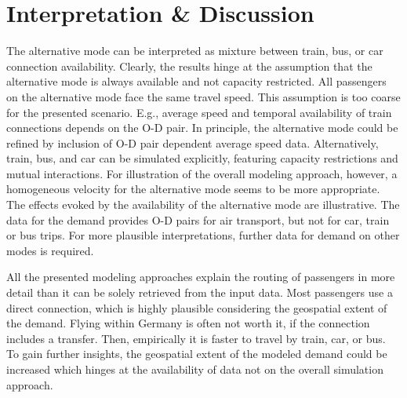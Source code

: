\section{Interpretation \& Discussion}
\label{sec:air_rail_discussion}

The alternative mode can be interpreted as mixture between train, bus, or car connection availability. 
Clearly, the results hinge at the assumption that the alternative mode is always available and not capacity restricted.  
All passengers on the alternative mode face the same travel speed. 
This assumption is too coarse for the presented scenario. 
E.g., average speed and temporal availability of train connections depends on the O-D pair. 
In principle, the alternative mode could be refined by inclusion of O-D pair dependent average speed data. 
Alternatively, train, bus, and car can be simulated explicitly, featuring capacity restrictions and mutual interactions. 
For illustration of the overall modeling approach, however, a homogeneous velocity for the alternative mode seems to be more appropriate. 
The effects evoked by the availability of the alternative mode are illustrative. 
The data for the demand provides O-D pairs for air transport, but not for car, train or bus trips.  
For more plausible interpretations, further data for demand on other modes is required. 



All the presented modeling approaches explain the routing of passengers in more detail than it can be solely retrieved from the input data.  
Most passengers use a direct connection, which is highly plausible considering the geospatial extent of the demand.  
Flying within Germany is often not worth it, if the connection includes a transfer. 
Then, empirically it is faster to travel by train, car, or bus. 
To gain further insights, the geospatial extent of the modeled demand could be increased which hinges at the availability of data not on the overall simulation approach. 

